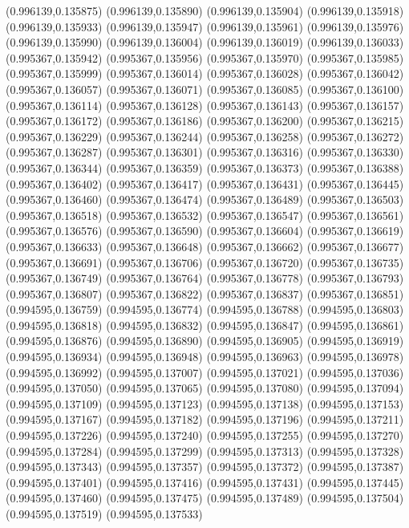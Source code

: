 (0.996139,0.135875)
(0.996139,0.135890)
(0.996139,0.135904)
(0.996139,0.135918)
(0.996139,0.135933)
(0.996139,0.135947)
(0.996139,0.135961)
(0.996139,0.135976)
(0.996139,0.135990)
(0.996139,0.136004)
(0.996139,0.136019)
(0.996139,0.136033)
(0.995367,0.135942)
(0.995367,0.135956)
(0.995367,0.135970)
(0.995367,0.135985)
(0.995367,0.135999)
(0.995367,0.136014)
(0.995367,0.136028)
(0.995367,0.136042)
(0.995367,0.136057)
(0.995367,0.136071)
(0.995367,0.136085)
(0.995367,0.136100)
(0.995367,0.136114)
(0.995367,0.136128)
(0.995367,0.136143)
(0.995367,0.136157)
(0.995367,0.136172)
(0.995367,0.136186)
(0.995367,0.136200)
(0.995367,0.136215)
(0.995367,0.136229)
(0.995367,0.136244)
(0.995367,0.136258)
(0.995367,0.136272)
(0.995367,0.136287)
(0.995367,0.136301)
(0.995367,0.136316)
(0.995367,0.136330)
(0.995367,0.136344)
(0.995367,0.136359)
(0.995367,0.136373)
(0.995367,0.136388)
(0.995367,0.136402)
(0.995367,0.136417)
(0.995367,0.136431)
(0.995367,0.136445)
(0.995367,0.136460)
(0.995367,0.136474)
(0.995367,0.136489)
(0.995367,0.136503)
(0.995367,0.136518)
(0.995367,0.136532)
(0.995367,0.136547)
(0.995367,0.136561)
(0.995367,0.136576)
(0.995367,0.136590)
(0.995367,0.136604)
(0.995367,0.136619)
(0.995367,0.136633)
(0.995367,0.136648)
(0.995367,0.136662)
(0.995367,0.136677)
(0.995367,0.136691)
(0.995367,0.136706)
(0.995367,0.136720)
(0.995367,0.136735)
(0.995367,0.136749)
(0.995367,0.136764)
(0.995367,0.136778)
(0.995367,0.136793)
(0.995367,0.136807)
(0.995367,0.136822)
(0.995367,0.136837)
(0.995367,0.136851)
(0.994595,0.136759)
(0.994595,0.136774)
(0.994595,0.136788)
(0.994595,0.136803)
(0.994595,0.136818)
(0.994595,0.136832)
(0.994595,0.136847)
(0.994595,0.136861)
(0.994595,0.136876)
(0.994595,0.136890)
(0.994595,0.136905)
(0.994595,0.136919)
(0.994595,0.136934)
(0.994595,0.136948)
(0.994595,0.136963)
(0.994595,0.136978)
(0.994595,0.136992)
(0.994595,0.137007)
(0.994595,0.137021)
(0.994595,0.137036)
(0.994595,0.137050)
(0.994595,0.137065)
(0.994595,0.137080)
(0.994595,0.137094)
(0.994595,0.137109)
(0.994595,0.137123)
(0.994595,0.137138)
(0.994595,0.137153)
(0.994595,0.137167)
(0.994595,0.137182)
(0.994595,0.137196)
(0.994595,0.137211)
(0.994595,0.137226)
(0.994595,0.137240)
(0.994595,0.137255)
(0.994595,0.137270)
(0.994595,0.137284)
(0.994595,0.137299)
(0.994595,0.137313)
(0.994595,0.137328)
(0.994595,0.137343)
(0.994595,0.137357)
(0.994595,0.137372)
(0.994595,0.137387)
(0.994595,0.137401)
(0.994595,0.137416)
(0.994595,0.137431)
(0.994595,0.137445)
(0.994595,0.137460)
(0.994595,0.137475)
(0.994595,0.137489)
(0.994595,0.137504)
(0.994595,0.137519)
(0.994595,0.137533)
